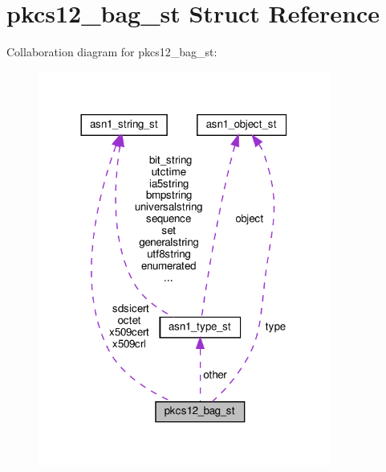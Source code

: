 \hypertarget{structpkcs12__bag__st}{}\section{pkcs12\+\_\+bag\+\_\+st Struct Reference}
\label{structpkcs12__bag__st}


Collaboration diagram for pkcs12\+\_\+bag\+\_\+st\+:
\nopagebreak
\begin{figure}[H]
\begin{center}
\leavevmode
\includegraphics[width=272pt]{structpkcs12__bag__st__coll__graph}
\end{center}
\end{figure}
